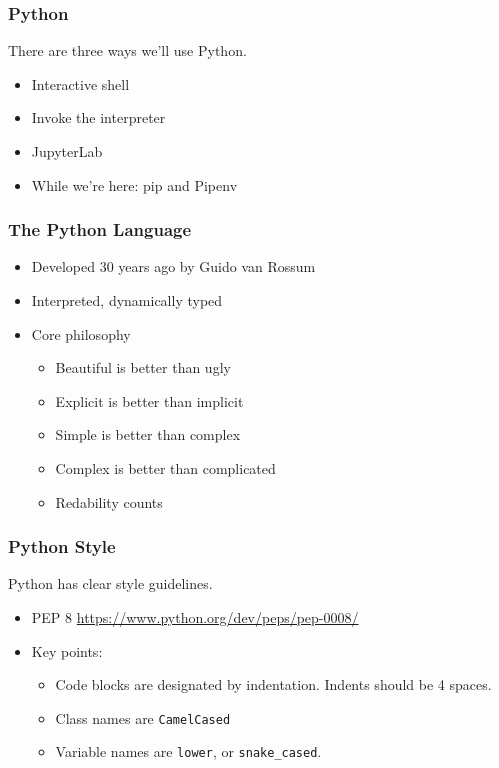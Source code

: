\documentclass[10pt]{beamer}
\begin{document}
\begin{frame}
  \frametitle{Python}

   There are three ways we'll use Python.
   
   \begin{itemize}
     \item Interactive shell
     \item Invoke the interpreter
     \item JupyterLab
     \item While we're here: pip and Pipenv
   \end{itemize}
\end{frame}

\begin{frame}
  \frametitle{The Python Language}
  
  \begin{itemize}
    \item Developed 30 years ago by Guido van Rossum
    \item Interpreted, dynamically typed
    \item Core philosophy
      \begin{itemize}
        \item Beautiful is better than ugly
        \item Explicit is better than implicit
        \item Simple is better than complex
        \item Complex is better than complicated
        \item Redability counts
      \end{itemize}   
  \end{itemize}

\end{frame}
\begin{frame}
  \frametitle{Python Style}

   Python has clear style guidelines.
   
   \begin{itemize}
     \item PEP 8 \url{https://www.python.org/dev/peps/pep-0008/}
     \item Key points:
       \begin{itemize}
         \item Code blocks are designated by indentation. Indents should be 4 spaces.
         \item Class names are \texttt{CamelCased}
         \item Variable names are \texttt{lower}, or \texttt{snake\_cased}.
       \end{itemize}
     \end{itemize}  
\end{frame}
\end{document}
